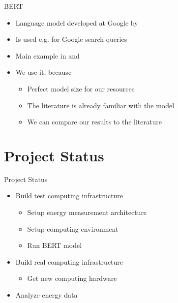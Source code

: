 \documentclass[serif, mathsansserif, aspectratio=169]{beamer}   %
\begin{document}
\begin{frame}{BERT}
    \begin{itemize}
        \setlength\itemsep{1em}
        \item[\labelitem] Language model developed at Google by 
        \item[\labelitem] Is used e.g. for Google search queries
        \item[\labelitem] Main example in  and 
        \item[\labelitem] We use it, because
            \begin{itemize}
            \setlength\itemsep{0.5em}
                \item Perfect model size for our resources
                \item The literature is already familiar with the model
                \item We can compare our results to the literature
            \end{itemize}
    \end{itemize}
\end{frame}


\section{Project Status}

\begin{frame}{Project Status}
    \begin{itemize}
        \setlength\itemsep{1.5em}
        \item[\labelitem] Build test computing infrastructure \quad \mycheck
            \begin{itemize}
            \setlength\itemsep{0.7em}
                \item Setup energy measurement architecture \quad \mycheck
                \item Setup computing environment \quad \mycheck
                \item Run BERT model \quad \textcolor{bonnyellow}{}
            \end{itemize}
        \item[\labelitem] Build real computing infrastructure \quad \mycross
            \begin{itemize}
            \setlength\itemsep{0.7em}
                \item Get new computing hardware \quad \mycross
            \end{itemize}
        \item[\labelitem] Analyze energy data \quad \mycross
    \end{itemize}
\end{frame}
\end{document}
